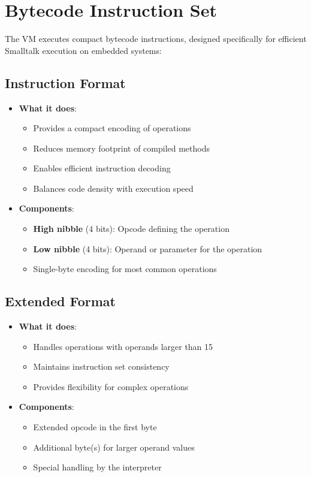\documentclass[12pt,a4paper]{report}
\begin{document}
\section{Bytecode Instruction Set}
The VM executes compact bytecode instructions, designed specifically for efficient Smalltalk execution on embedded systems:

\subsection{Instruction Format}
\begin{itemize}
    \item \textbf{What it does}:
    \begin{itemize}
        \item Provides a compact encoding of operations
        \item Reduces memory footprint of compiled methods
        \item Enables efficient instruction decoding
        \item Balances code density with execution speed
    \end{itemize}
    
    \item \textbf{Components}:
    \begin{itemize}
        \item \textbf{High nibble} (4 bits): Opcode defining the operation
        \item \textbf{Low nibble} (4 bits): Operand or parameter for the operation
        \item Single-byte encoding for most common operations
    \end{itemize}
\end{itemize}

\subsection{Extended Format}
\begin{itemize}
    \item \textbf{What it does}:
    \begin{itemize}
        \item Handles operations with operands larger than 15
        \item Maintains instruction set consistency
        \item Provides flexibility for complex operations
    \end{itemize}
    
    \item \textbf{Components}:
    \begin{itemize}
        \item Extended opcode in the first byte
        \item Additional byte(s) for larger operand values
        \item Special handling by the interpreter
    \end{itemize}
\end{itemize}
\end{document}
